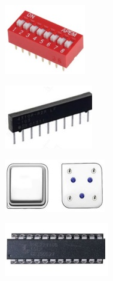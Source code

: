 \begin{figure}[!htb]
    \centering
    
    \begin{minipage}{.4\textwidth}
        \centering
        \includegraphics[width=0.6\linewidth]{include/figures/Microinterruptores.jpg}
        \label{Microinterruptores} 
    \end{minipage}
    \begin{minipage}{.4\textwidth}
        \centering
        \includegraphics[width=0.5\linewidth]{include/figures/Barra.jpg}
        \label{Resistencias} 
    \end{minipage}
    
    \begin{minipage}{.4\textwidth}
        \centering
        \includegraphics[width=0.6\linewidth]{include/figures/Oscilador.jpg}
        \label{Oscilador} 
    \end{minipage}
    \begin{minipage}{.4\textwidth}
        \centering
        \includegraphics[width=0.5\linewidth]{include/figures/GALg22v10.jpg}
        \label{GAL} 
    \end{minipage}


\end{figure}
